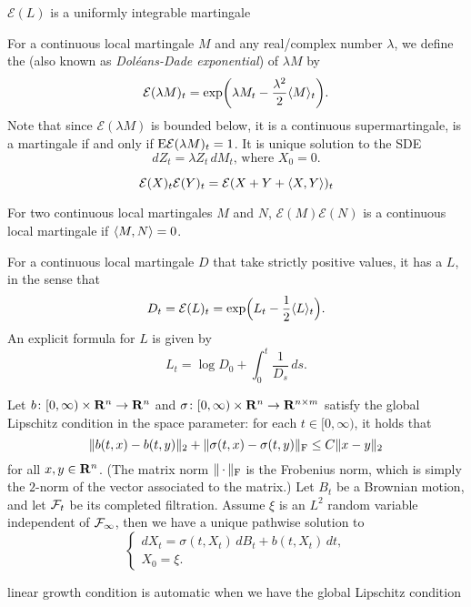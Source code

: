 \documentclass[10pt]{book}
\begin{document}
$\mathcal E(L)$ is a uniformly integrable martingale

For a continuous local martingale $M$ and any real/complex number $\lambda$, we define the  (also known as \emph{Doléans-Dade exponential}) of $\lambda M$ by \[
    \mathcal E(\lambda M)_t = \exp\biggl(\lambda M_t - \frac{\lambda^2}{2}\langle M \rangle_t\biggr).
\] Note that since $\mathcal E(\lambda M)$ is bounded below, it is a continuous supermartingale, is a martingale if and only if $\mathop{}\!\mathrm{E} \mathcal E(\lambda M)_t = 1$.
It is unique solution to the SDE \[
    dZ_t = \lambda Z_t\,dM_t\text{, where } X_0 = 0.
\]


\[
    \mathcal E(X)_t \mathcal E(Y)_t = \mathcal E(X+Y + \langle X, Y \rangle)_t
\]

For two continuous local martingales $M$ and $N$, $\mathcal E (M) \mathcal E (N)$ is a continuous local martingale if $\langle M, N \rangle = 0$.

\begin{thm}
    For a continuous local martingale $D$ that take strictly positive values, it has a  $L$, in the sense that \[
        D_t = \mathcal E (L)_t = \exp\Bigl(L_t - \frac{1}{2}\langle L \rangle_t\Bigr).
    \] An explicit formula for $L$ is given by \[
        L_t = \log D_0 + \int_0^t \frac{1}{D_s}\,ds.
    \]
\end{thm}

\begin{namedthm}
    Let $b\colon [0,\infty) \times \mathbf{R}^n \to \mathbf{R}^n$ and $\sigma\colon [0,\infty) \times \mathbf{R}^n \to \mathbf{R}^{n\times m}$ satisfy the global Lipschitz condition in the space parameter: for each $t\in [0,\infty)$, it holds that \[
        \lVert b(t,x) - b(t,y) \rVert_2 + \lVert \sigma(t,x) - \sigma(t,y) \rVert_{\mathrm F} \leq C \lVert x- y  \rVert_2
    \] for all $x,y\in \mathbf{R}^n$. (The matrix norm $\lVert \,\cdot\, \rVert_{\mathrm F}$ is the Frobenius norm, which is simply the $2$-norm of the vector associated to the matrix.) Let $B_t$ be a Brownian motion, and let $\mathcal{F}_t$ be its completed filtration. Assume $\xi$ is an $L^2$ random variable independent of $\mathcal{F}_\infty$, then we have a unique pathwise solution to \[
        \begin{cases}
            dX_t = \sigma(t,X_t)\,dB_t + b(t,X_t)\,dt,\\ X_0 = \xi.
        \end{cases}
    \]
\end{namedthm}

linear growth condition is automatic when we have the global Lipschitz condition
\end{document}
